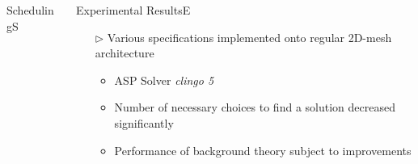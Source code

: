 \documentclass[final]{beamer} %
\newlength\colwidth
\renewcommand{\blacktriangleright}{\triangleright}
\begin{document}
\begin{frame}{}
\begin{columns}[T]
\begin{column}{\colwidth}
\begin{myblock}{Scheduling}{S}
\begin{center}
  						
  						
  					\end{center}
  					\vspace*{-11mm}
  				\end{myblock}
  			\end{column}
  			\begin{column}{\colwidth}
  				\begin{tcolorbox}[size=minimal,equal height group=S,colback=tlg,colframe=tlg,beforeafter skip=0.0cm,toptitle=0mm,bottomtitle=0mm]
	  				\vspace*{-0.5cm}
	  				\begin{myblock}{Experimental Results}{E}
	  					\begin{itemize}
	  						\item[\color{HRO1}$\blacktriangleright$] Various specifications implemented onto regular 2D-mesh architecture
	  						\begin{itemize}
	  							\item ASP Solver \emph{clingo 5} \cite{gekakaosscwa16a}
	  							\item Number of necessary choices to find a solution decreased significantly
	  							\item Performance of background theory subject to improvements
	  						\end{itemize}
	  					\end{itemize}
	  					\begin{center}
		  					

\end{center}
\end{myblock}
\end{tcolorbox}
\end{column}
\end{columns}
\end{frame}
\end{document}
